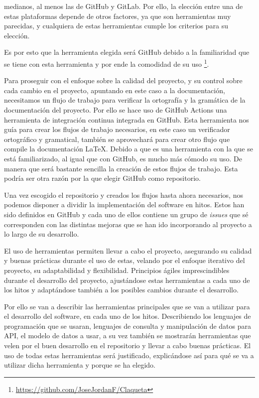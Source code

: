 medianos, al menos las de GitHub y GitLab. Por ello, la elección entre una de estas plataformas depende de 
otros factores, ya que son herramientas muy parecidas, y cualquiera de estas herramientas cumple los criterios
para su elección.


Es por esto que la herramienta elegida será GitHub debido a la familiaridad que se tiene con esta herramienta y 
por ende la comodidad de su uso \footnote{\url{https://github.com/JoseJordanF/Claqueta}}.

Para proseguir con el enfoque sobre la calidad del proyecto, y su control sobre cada cambio en el proyecto, apuntando 
en este caso a la documentación, necesitamos un flujo de trabajo para verificar la ortografía y la gramática de la 
documentación del proyecto. Por ello se hace uso de GitHub Actions una herramienta de integración continua integrada 
en GitHub. Esta herramienta nos guía para crear los flujos de trabajo necesarios, en este caso un verificador 
ortográfico y gramatical, también se aprovechará para crear otro flujo que compile la documentación LaTeX. Debido a 
que es una herramienta con la que se está familiarizado, al igual que con GitHub, es mucho más cómodo su uso. De 
manera que será bastante sencilla la creación de estos flujos de trabajo. Esta podría ser otra razón por la que 
elegir GitHub como repositorio.

Una vez escogido el repositorio y creados los flujos hasta ahora necesarios, nos podemos disponer a dividir la 
implementación del software en hitos. Estos han sido definidos en GitHub y cada uno de ellos contiene un grupo de 
\textit{issues} que sé corresponden con las distintas mejoras que se han ido incorporando al proyecto a lo largo
de su desarrollo.

El uso de herramientas permiten llevar a cabo el proyecto, asegurando su calidad y buenas prácticas 
durante el uso de estas, velando por el enfoque iterativo del proyecto, su adaptabilidad y flexibilidad.
Principios ágiles imprescindibles durante el desarrollo del proyecto, ajustándose estas herramientas a cada
uno de los hitos y adaptándose también a los posibles cambios durante el desarrollo.


Por ello se van a describir las herramientas principales que se van a utilizar para el desarrollo 
del software, en cada uno de los hitos. Describiendo los lenguajes de programación que se usaran, 
lenguajes de consulta y manipulación de datos para API, el modelo de datos a usar, a su vez también 
se mostrarán herramientas que velen por el buen desarrollo en el repositorio y llevar a cabo buenas 
prácticas. El uso de todas estas herramientas será justificado, explicándose así para qué se va a 
utilizar dicha herramienta y porque se ha elegido.


